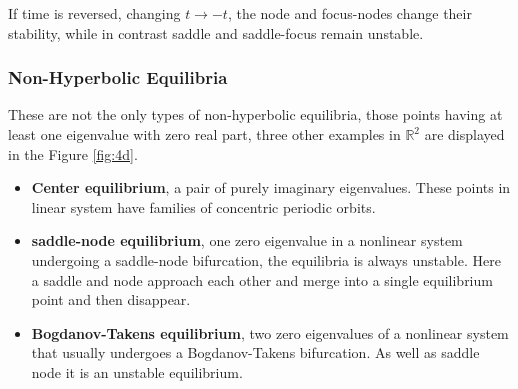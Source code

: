 If time is reversed, changing $t\to -t$, the node and focus-nodes change their stability, while in contrast saddle and saddle-focus remain unstable.


\subsubsection{Non-Hyperbolic Equilibria}

These are not the only types of non-hyperbolic equilibria, those points having at least one eigenvalue with zero real part, three other examples in $\mathbb{R}^2$ are displayed in the Figure \ref{fig:4d}.


\begin{itemize}
    \item \textbf{Center equilibrium}, a pair of purely imaginary eigenvalues. These points in linear system have families of concentric periodic orbits. 
    
    \item \textbf{saddle-node equilibrium}, one zero eigenvalue in a nonlinear system undergoing a saddle-node bifurcation, the equilibria is always unstable. Here a saddle and node approach each other and merge into a single equilibrium point and then disappear.
    
    \item \textbf{Bogdanov-Takens equilibrium}, two zero eigenvalues of a nonlinear system that usually undergoes a Bogdanov-Takens bifurcation. As well as saddle node it is an unstable equilibrium.
\end{itemize}



